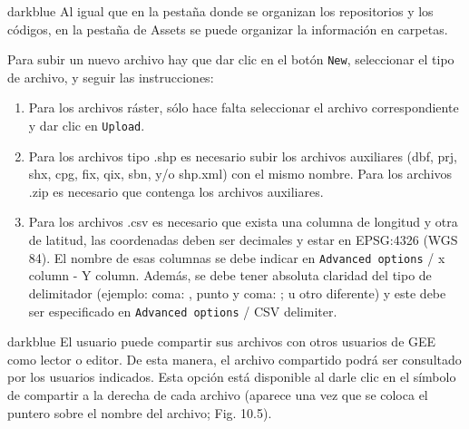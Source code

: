 \documentclass[
  12pt,
  letterpaper,
  twoside]{book}
\providecommand{\tightlist}{%
  \setlength{\itemsep}{0pt}\setlength{\parskip}{0pt}}
\begin{document}
\begin{bluebox2}

\begin{awesomeblock}{5pt}{\faLightbulb}{darkblue}
Al igual que en la pestaña donde se organizan los repositorios y los códigos, en la pestaña de Assets se puede organizar la información en carpetas.

\end{awesomeblock}

\end{bluebox2}

Para subir un nuevo archivo hay que dar clic en el botón \texttt{New}, seleccionar el tipo de archivo, y seguir las instrucciones:

\begin{enumerate}
\def\labelenumi{\arabic{enumi}.}
\tightlist
\item
  Para los archivos ráster, sólo hace falta seleccionar el archivo correspondiente y dar clic en \texttt{Upload}.
\item
  Para los archivos tipo .shp es necesario subir los archivos auxiliares (dbf, prj, shx, cpg, fix, qix, sbn, y/o shp.xml) con el mismo nombre. Para los archivos .zip es necesario que contenga los archivos auxiliares.
\item
  Para los archivos .csv es necesario que exista una columna de longitud y otra de latitud, las coordenadas deben ser decimales y estar en EPSG:4326 (WGS 84). El nombre de esas columnas se debe indicar en \texttt{Advanced\ options} / x column - Y column. Además, se debe tener absoluta claridad del tipo de delimitador (ejemplo: coma: , punto y coma: ; u otro diferente) y este debe ser especificado en \texttt{Advanced\ options} / CSV delimiter.
\end{enumerate}

\begin{bluebox2}

\begin{awesomeblock}{5pt}{\faLightbulb}{darkblue}
El usuario puede compartir sus archivos con otros usuarios de GEE como lector o editor. De esta manera, el archivo compartido podrá ser consultado por los usuarios indicados. Esta opción está disponible al darle clic en el símbolo de compartir a la derecha de cada archivo (aparece una vez que se coloca el puntero sobre el nombre del archivo; Fig. 10.5).

\end{awesomeblock}

\end{bluebox2}
\end{document}
